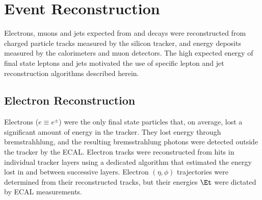 \chapter{Event Reconstruction}
\label{sec:reco_chapter}

Electrons, muons and jets expected from \WR and \nul decays were reconstructed from charged particle 
tracks measured by the silicon tracker, and energy deposits measured by the calorimeters and muon 
detectors.  The high expected energy of final state leptons and jets motivated the use of specific 
lepton and jet reconstruction algorithms described herein.

\section{Electron Reconstruction}
\label{sec:eleReco}
Electrons ($e \equiv e^{\pm}$) were the only final state particles that, on average, lost a significant 
amount of energy in the tracker.  They lost energy through bremstrahhlung, and the resulting bremsstrahlung 
photons were detected outside the tracker by the ECAL.  Electron tracks were reconstructed from hits in 
individual tracker layers using a dedicated algorithm that estimated the energy lost in and between 
successive layers.  Electron $(\eta, \phi)$ trajectories were determined from their reconstructed tracks, 
but their energies $\Et$ were dictated by ECAL measurements.

